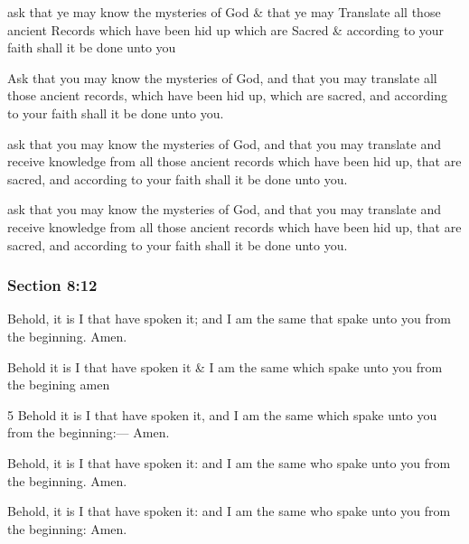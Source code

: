 		\begin{framed}
		\scriptsize
			\begin{compactdesc}
				\item[JSP] ask that ye may know the mysteries of God \& that ye may Translate all those ancient Records which have been hid up which are Sacred \& according to your faith shall it be done unto you
				\item[BC] Ask that you may know the mysteries of God, and that you may translate all those ancient records, which have been hid up, which are sacred, and according to your faith shall it be done unto you.
				\item[DC 1835] ask that you may know the mysteries of God, and that you may translate and receive knowledge from all those ancient records which have been hid up, that are sacred, and according to your faith shall it be done unto you. 
				\item[DC 1844] ask that you may know the mysteries of God, and that you may translate and receive knowledge from all those ancient records which have been hid up, that are sacred, and according to your faith shall it be done unto you. 
			\end{compactdesc}
		\end{framed}

	\subsubsection{Section 8:12} %
		\label{DC8-12}

		Behold, it is I that have spoken it; and I am the same that spake unto you from the beginning.  Amen.

		\begin{framed}
		\scriptsize
			\begin{compactdesc}
				\item[JSP] Behold it is I that have spoken it \& I am the same which spake unto you from the begining amen
				\item[BC] 5 Behold it is I that have spoken it, and I am the same which spake unto you from the beginning:--- Amen.
				\item[DC 1835] Behold, it is I that have spoken it: and I am the same who spake unto you from the beginning. Amen.
				\item[DC 1844] Behold, it is I that have spoken it: and I am the same who spake unto you from the beginning: Amen.
			\end{compactdesc}
		\end{framed}